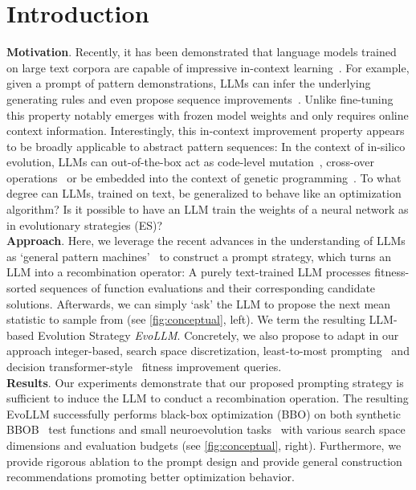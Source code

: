 \newpage
\section{Introduction}

\textbf{Motivation}. Recently, it has been demonstrated that language models trained on large text corpora are capable of impressive in-context learning~\cite{brown2020language}. For example, given a prompt of pattern demonstrations, LLMs can infer the underlying generating rules and even propose sequence improvements~\cite{mirchandani2023large}.
%
Unlike fine-tuning this property notably emerges with frozen model weights and only requires online context information. Interestingly, this in-context improvement property appears to be broadly applicable to abstract pattern sequences: In the context of in-silico evolution, LLMs can out-of-the-box act as code-level mutation~\cite{chen2023evoprompting}, cross-over operations~\cite{meyerson2023language} or be embedded into the context of genetic programming~\cite{lehman2023evolution}. 
%
To what degree can LLMs, trained on text, be generalized to behave like an optimization algorithm? Is it possible to have an LLM train the weights of a neural network as in evolutionary strategies (ES)? \\
%
\textbf{Approach}. Here, we leverage the recent advances in the understanding of LLMs as ‘general pattern machines’~\cite{mirchandani2023large} to construct a prompt strategy, which turns an LLM into a recombination operator:  A purely text-trained LLM processes fitness-sorted sequences of function evaluations and their corresponding candidate solutions. Afterwards, we can simply `ask' the LLM to propose the next mean statistic to sample from (see \cref{fig:conceptual}, left). We term the resulting LLM-based Evolution Strategy \textit{EvoLLM}. Concretely, we also propose to adapt in our approach integer-based, search space discretization, least-to-most prompting~\cite{zhou2022least} and decision transformer-style~\cite{chen2021decision} fitness improvement queries.\\
%
%
\textbf{Results}. Our experiments demonstrate that our proposed prompting strategy is sufficient to induce the LLM to conduct a recombination operation. The resulting EvoLLM successfully performs black-box optimization (BBO) on both synthetic BBOB~\cite{hansen2010real} test functions and small neuroevolution tasks~\cite{brockman2016openai, gymnax2022github} with various search space dimensions and evaluation budgets (see \cref{fig:conceptual}, right). Furthermore, we provide rigorous ablation to the prompt design and provide general construction recommendations promoting better optimization behavior. 
